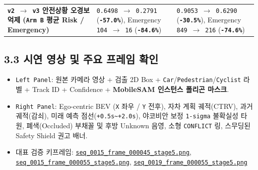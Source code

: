\documentclass[10.5pt,a4paper]{article}
\begin{document}
\begin{footnotesize}
\begin{longtable}{>{\raggedright\arraybackslash}p{} >{\raggedright\arraybackslash}p{} >{\raggedright\arraybackslash}p{}}
\textbf{\texttt{v2 $\rightarrow$ v3} 안전상황 오경보 억제 (\texttt{Arm B} 평균 Risk / Emergency)} & \texttt{0.\allowbreak{}6498 $\rightarrow$ 0.\allowbreak{}2791} (\textbf{\texttt{-\allowbreak{}57.\allowbreak{}0\%}}), Emergency \texttt{104 $\rightarrow$ 16} (\textbf{\texttt{-\allowbreak{}84.\allowbreak{}6\%}}) & \texttt{0.\allowbreak{}9053 $\rightarrow$ 0.\allowbreak{}6290} (\textbf{\texttt{-\allowbreak{}30.\allowbreak{}5\%}}), Emergency \texttt{849 $\rightarrow$ 216} (\textbf{\texttt{-\allowbreak{}74.\allowbreak{}6\%}}) \\
\end{longtable}
\end{footnotesize}


\subsection{3.3 시연 영상 및 주요 프레임 확인}
\begin{itemize}[leftmargin=1.5em,itemsep=2pt]
\item \texttt{Left Panel}: 원본 카메라 영상 + 검출 2D Box + \texttt{Car}/\texttt{Pedestrian}/\texttt{Cyclist} 라벨 + Track ID + Confidence + \textbf{MobileSAM 인스턴스 폴리곤 마스크}.
\item \texttt{Right Panel}: Ego-centric BEV (\texttt{X} 좌우 / \texttt{Y} 전후), 자차 계획 궤적(CTRV), 과거 궤적(감쇠), 미래 예측 점선(\texttt{+0.\allowbreak{}5s\textasciitilde{}+2.\allowbreak{}0s}), 야코비안 보정 \texttt{1-\allowbreak{}sigma} 불확실성 타원, 폐색(Occluded) 부채꼴 및 후방 Unknown 음영, 소형 \texttt{CONFLICT} 링, 스무딩된 Safety Shield 권고 배너.
\item 대표 검증 키프레임: \href{https://github.com/Heisnotanimposter/Totalcare\_autonomous\_driving\_Yolov5/blob/main/results/v3\_bev\_fixed/world\_outputs/world\_model\_0015\_staged/keyframes/seq\_0015\_frame\_000045\_stage5.png}{\texttt{seq\_\allowbreak{}0015\_\allowbreak{}frame\_\allowbreak{}000045\_\allowbreak{}stage5.\allowbreak{}png}}, \href{https://github.com/Heisnotanimposter/Totalcare\_autonomous\_driving\_Yolov5/blob/main/results/v3\_bev\_fixed/world\_outputs/world\_model\_0015\_staged/keyframes/seq\_0015\_frame\_000055\_stage5.png}{\texttt{seq\_\allowbreak{}0015\_\allowbreak{}frame\_\allowbreak{}000055\_\allowbreak{}stage5.\allowbreak{}png}}, \href{https://github.com/Heisnotanimposter/Totalcare\_autonomous\_driving\_Yolov5/blob/main/results/v3\_bev\_fixed/world\_outputs/world\_model\_0019\_staged/keyframes/seq\_0019\_frame\_000055\_stage5.png}{\texttt{seq\_\allowbreak{}0019\_\allowbreak{}frame\_\allowbreak{}000055\_\allowbreak{}stage5.\allowbreak{}png}}
\end{itemize}
\end{document}
